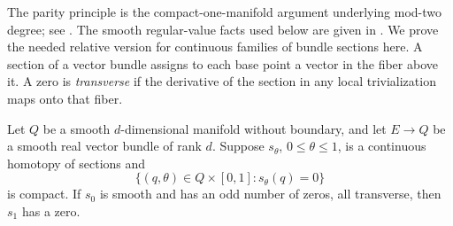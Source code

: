 The parity principle is the compact-one-manifold argument underlying
mod-two degree; see \cite[Section~4]{Milnor1965}. The smooth regular-value
facts used below are given in \cite[Sections~2--3]{Milnor1965}.
We prove the needed relative version for continuous families of bundle
sections here. A section of a vector bundle assigns to each base point a
vector in the fiber above it.  A zero is \emph{transverse} if the
derivative of the section in any local trivialization maps onto that
fiber.

\begin{lemma}\label{path:parity}
Let $Q$ be a smooth $d$-dimensional manifold without boundary, and let
$E\to Q$ be a smooth real vector bundle of rank $d$.  Suppose
$s_\theta$, $0\leq\theta\leq1$, is a continuous homotopy of sections and
\[
 \{(q,\theta)\in Q\times[0,1]:s_\theta(q)=0\}
\]
is compact.  If $s_0$ is smooth and has an odd number of zeros, all
transverse, then $s_1$ has a zero.
\end{lemma}

